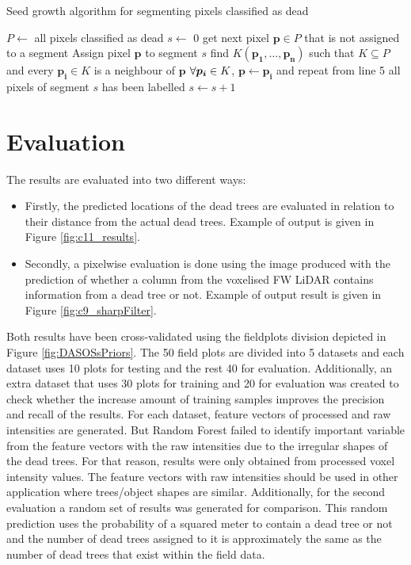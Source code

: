 \documentclass{subfiles}
\begin{document}
 \begin{algorithm}
 	\caption{Seed growth algorithm for segmenting pixels classified as dead}
 	\label{alg:seedGrownth}
 	\centering
 	\begin{algorithmic}[1]
 		\State $P \gets $ all pixels classified as dead  %
 		\State $s \gets $ 0 
        \State get next pixel $\boldsymbol{p} \in P$ that is not assigned to a segment
 		\State  Assign pixel $\boldsymbol{p} $ to segment $s$
 		\State  find $K(\boldsymbol{p_1},\dots, \boldsymbol{p_n})$ such that $K \subseteq P$ and every $\boldsymbol{p_i} \in K$ is a neighbour of $\boldsymbol{p}$
 		\State $ \forall \space \boldsymbol{p_i} \in K $, $\boldsymbol{p} \gets \boldsymbol{p_i}$ and repeat from line 5
 		\State all pixels of segment $s$ has been labelled
 		\State $s \gets s + 1 $
 		\EndWhile
 	\end{algorithmic}
 \end{algorithm}



\section{Evaluation} 
\par The results are evaluated into two different ways: 
\begin{itemize}
	\item Firstly, the predicted locations of the dead trees are evaluated in relation to their distance from the actual dead trees. Example of output is given in Figure \ref{fig:c11_results}. 
	\item Secondly, a pixelwise evaluation is done using the image produced with the prediction of whether a column from the voxelised FW LiDAR contains information from a dead tree or not. Example of output result is given in Figure \ref{fig:c9_sharpFilter}.	
\end{itemize}

\par Both results have been cross-validated using the fieldplots division depicted in Figure \ref{fig:DASOSsPriors}. The 50 field plots are divided into 5 datasets and each dataset uses 10 plots for testing and the rest 40 for evaluation. Additionally, an extra dataset that uses 30 plots for training and 20 for evaluation was created to check whether the increase amount of training samples improves the precision and recall of the results. For each dataset, feature vectors of processed and raw intensities are generated. But Random Forest failed to identify important variable from the feature vectors with the raw intensities due to the irregular shapes of the dead trees. For that reason, results were only obtained from processed voxel intensity values. The feature vectors with raw intensities should be used in other application where trees/object shapes are similar. Additionally, for the second evaluation a random set of results was generated for comparison. This random prediction uses the probability of a squared meter to contain a dead tree or not and the number of dead trees assigned to it is approximately the same as the number of dead trees that exist within the field data.
\end{document}
